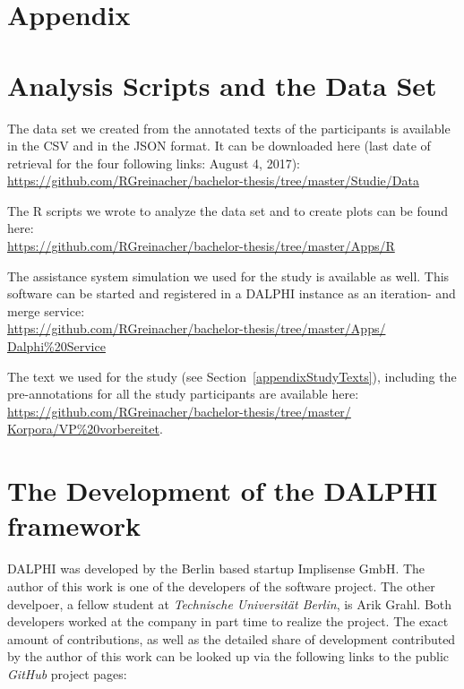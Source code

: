 \section{Appendix}
\label{sec:appendix}

\appendix

\section{Analysis Scripts and the Data Set}
  The data set we created from the annotated texts of the participants is available in the CSV and in the JSON format. It can be downloaded here (last date of retrieval for the four following links: August 4, 2017): \\
  \url{https://github.com/RGreinacher/bachelor-thesis/tree/master/Studie/Data}

  The R scripts we wrote to analyze the data set and to create plots can be found here: \\
  \url{https://github.com/RGreinacher/bachelor-thesis/tree/master/Apps/R}

  The assistance system simulation we used for the study is available as well. This software can be started and registered in a \ac{DALPHI} instance as an iteration- and merge service: \\
  \url{https://github.com/RGreinacher/bachelor-thesis/tree/master/Apps/} \\
  \url{Dalphi%20Service}

  The text we used for the study (see Section~\ref{appendixStudyTexts}), including the pre-annotations for all the study participants are available here: \\
  \url{https://github.com/RGreinacher/bachelor-thesis/tree/master/} \\
  \url{Korpora/VP%20vorbereitet}.

\section{The Development of the \ac{DALPHI} framework}
  \label{appendixDalphiDev}
  \ac{DALPHI} was developed by the Berlin based startup Implisense GmbH. The author of this work is one of the developers of the software project. The other develpoer, a fellow student at \textit{Technische Universität Berlin}, is Arik Grahl. Both developers worked at the company in part time to realize the project. The exact amount of contributions, as well as the detailed share of development contributed by the author of this work can be looked up via the following links to the public \textit{GitHub} project pages:

